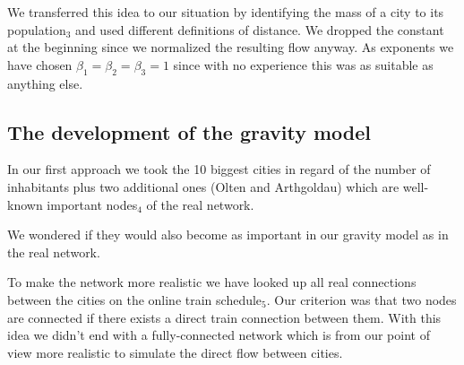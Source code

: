 \documentclass[11pt]{article}
\begin{document}
We transferred this idea to our situation by identifying the mass of a city to its population$_3$ and used different definitions of distance. We dropped the constant at the beginning since we normalized the resulting flow anyway. As exponents we have chosen $\beta_1=\beta_2=\beta_3=1$ since with no experience this was as suitable as anything else.\newline

\subsection{The development of the gravity model}
In our first approach we took the 10  biggest cities in regard of the number of inhabitants plus two additional ones (Olten and Arthgoldau) which are well-known important nodes$_4$ of the real network.

We wondered if they would also become as important  in our gravity model as in the real network.\newline

To make the network more realistic we have looked up all real connections between the cities on the online train schedule$_5$. Our criterion was that two nodes are connected if there exists a direct train connection between them. With this idea we didn't end with a fully-connected network which is from our point of view more realistic to simulate the direct flow between cities.
\end{document}
